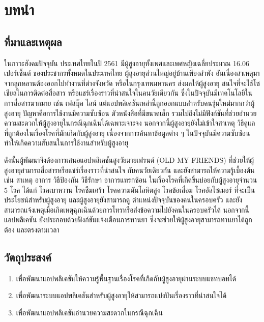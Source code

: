 \chapter{บทนำ}

\section{ที่มาและเหตุผล}
ในภาวะสังคมปัจจุบัน ประเทศไทยในปี 2561 มีผู้สูงอายุทั้งเพศและเพศหญิงเฉลี่ยประมาณ 16.06 เปอร์เซ็นต์ ของประชากรทั้งหมดในประเทศไทย \cite{dop} 
ผู้สูงอายุส่วนใหญ่อยู่บ้านเพียงลำพัง อันเนื่องสาเหตุมาจากลูกหลานต้องออกไปทำงานที่ต่างจังหวัด หรือในกรุงเทพมหานคร ส่งผลให้ผู้สูงอายุ
สนใจที่จะใช้โซเชียลในการติดต่อสื่อสาร หรือแชร์เรื่องราวที่น่าสนใจในคนวัยเดียวกัน ซึ่งในปัจจุบันมีเทคโนโลยีในการสื่อสารมากมาย เช่น เฟสบุ๊ค ไลน์
แต่แอปพลิเคชันเหล่านี้ถูกออกแบบสำหรับคนรุ่นใหม่มากกว่าผู้สูงอายุ ปัญหาคือการใช้งานมีความซับซ้อน ตัวหนังสือที่มีขนาดเล็ก 
รวมไปถึงไม่มีฟังก์ชันที่ช่วยอำนวยความสะดวกให้ผู้สูงอายุในกรณีฉุกเฉินได้เฉพาะเจาะจง นอกจากนี้ผู้สูงอายุยังไม่เข้าใจสาเหตุ วิธีดูแล ที่ถูกต้องในเรื่องโรคที่มักเกิดกับผู้สูงอายุ 
เนื่องจากการค้นหาข้อมูลต่าง ๆ ในปัจจุบันมีความซับซ้อน ทำให้เกิดความสับสนในการใช้งานสำหรับผู้สูงอายุ

ดังนั้นผู้พัฒนาจึงต้องการเสนอแอปพลิเคชันสูงวัยมายเฟรนด์ (OLD MY FRIENDS) ที่ช่วยให้ผู้สูงอายุสามารถสื่อสารหรือแชร์เรื่องราวที่น่าสนใจ
กับคนวัยเดียวกัน และยังสามารถให้ความรู้เบื้องต้น เช่น สาเหตุ อาการ วิธีป้องกัน วิธีรักษา อาการแทรกซ้อน ในเรื่องโรคที่เกิดขึ้นบ่อยกับผู้สูงอายุจำนวน 5 โรค \cite{thaihealth} ได้แก่ 
โรคเบาหวาน โรคซึมเศร้า โรคความดันโลหิตสูง โรคข้อเสื่อม โรคอัลไซเมอร์ ที่จะเป็นประโยชน์สำหรับผู้สูงอายุ และผู้สูงอายุยังสามารถดู
ตำแหน่งปัจจุบันของคนในครอบครัว และยังสามารถแจ้งเหตุเมื่อเกิดเหตุฉุกเฉินด้วยการโทรหรือส่งข้อความไปยังคนในครอบครัวได้ นอกจากนี้
แอปพลิเคชัน ยังประกอบด้วยฟังก์ชันแจ้งเตือนการทานยา ซึ่งจะช่วยให้ผู้สูงอายุสามารถทานยาได้ถูกต้อง และตรงตามเวลา

\section{วัตถุประสงค์}
\begin{enumerate}
	\item เพื่อพัฒนาแอปพลิเคชันให้ความรู้พื้นฐานเรื่องโรคที่เกิดกับผู้สูงอายุผ่านระบบแชทบอทได้
	\item เพื่อพัฒนาระบบแอปพลิเคชันสำหรับผู้สูงอายุให้สามารถแบ่งปันเรื่องราวที่น่าสนใจได้
	\item เพื่อพัฒนาแอปพลิเคชันอำนวยความสะดวกในกรณีฉุกเฉิน
\end{enumerate}
